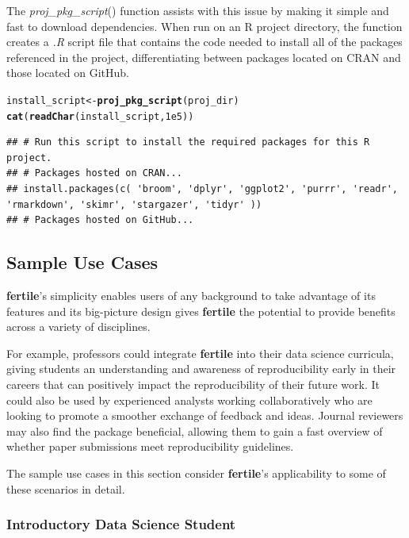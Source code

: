 \documentclass[APA,LATO1COL]{WileyNJD-v2}\usepackage[]{graphicx}\usepackage[]{color}
\makeatletter
\newcommand{\hlnum}[1]{\textcolor[rgb]{0.686,0.059,0.569}{#1}}%
\newcommand{\hlstd}[1]{\textcolor[rgb]{0.345,0.345,0.345}{#1}}%
\newcommand{\hlkwb}[1]{\textcolor[rgb]{0.69,0.353,0.396}{#1}}%
\newcommand{\hlkwd}[1]{\textcolor[rgb]{0.737,0.353,0.396}{\textbf{#1}}}%
\newenvironment{kframe}{%
 \def\at@end@of@kframe{}%
 \ifinner\ifhmode%
  \def\at@end@of@kframe{\end{minipage}}%
  \begin{minipage}{\columnwidth}%
 \fi\fi%
 \def\FrameCommand##1{\hskip\@totalleftmargin \hskip-\fboxsep
 \colorbox{shadecolor}{##1}\hskip-\fboxsep
     \hskip-\linewidth \hskip-\@totalleftmargin \hskip\columnwidth}%
 \MakeFramed {\advance\hsize-\width
   \@totalleftmargin\z@ \linewidth\hsize
   \@setminipage}}%
 {\par\unskip\endMakeFramed%
 \at@end@of@kframe}
\newenvironment{knitrout}{}{} %
\newcommand{\R}{\textsf{R}\xspace}
\newcommand{\cmd}[1]{\textit{#1}}
\newcommand{\pkg}[1]{\textbf{#1}}
\newcommand{\func}[1]{\textit{#1}()}
\makeatother
\begin{document}
The \func{proj\_pkg\_script} function assists with this issue by making it simple and fast to download dependencies. When run on an \R project directory, the function creates a \cmd{.R} script file that contains the code needed to install all of the packages referenced in the project, differentiating between packages located on CRAN and those located on GitHub.

\begin{knitrout}
\color{fgcolor}\begin{kframe}
\begin{alltt}
\hlstd{install_script} \hlkwb{<-} \hlkwd{proj_pkg_script}\hlstd{(proj_dir)}
\hlkwd{cat}\hlstd{(}\hlkwd{readChar}\hlstd{(install_script,} \hlnum{1e5}\hlstd{))}
\end{alltt}
\begin{verbatim}
## # Run this script to install the required packages for this R project.
## # Packages hosted on CRAN...
## install.packages(c( 'broom', 'dplyr', 'ggplot2', 'purrr', 'readr', 'rmarkdown', 'skimr', 'stargazer', 'tidyr' ))
## # Packages hosted on GitHub...
\end{verbatim}
\end{kframe}
\end{knitrout}


\subsection{Sample Use Cases}

\pkg{fertile}'s simplicity enables users of any background to take advantage of its features and its big-picture design gives \pkg{fertile} the potential to provide benefits across a variety of disciplines. 

For example, professors could integrate \pkg{fertile} into their data science curricula, giving students an understanding and awareness of reproducibility early in their careers that can positively impact the reproducibility of their future work. It could also be used by experienced analysts working collaboratively who are looking to promote a smoother exchange of feedback and ideas. Journal reviewers may also find the package beneficial, allowing them to gain a fast overview of whether paper submissions meet reproducibility guidelines.

The sample use cases in this section consider \pkg{fertile}'s applicability to some of these scenarios in detail.

\subsubsection{Introductory Data Science Student}
\end{document}
